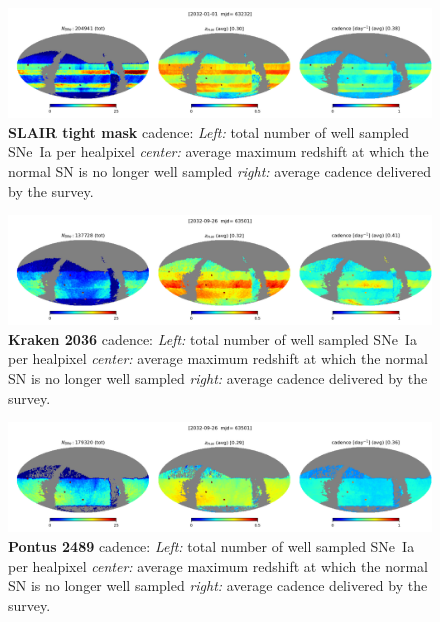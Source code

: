 \begin{figure}[h!]
  \begin{center}
    \includegraphics[width=\linewidth]{Figures/tight_mask_10yrs_64_maps.png}
    \caption{{\bf SLAIR tight mask} cadence: {\em Left:} total number of well
      sampled SNe~Ia per healpixel {\em center:} average maximum
      redshift at which the normal SN is no longer well sampled {\em
        right:} average cadence delivered by the survey.}
    \label{fig:tight_mask}
  \end{center}
\end{figure}

\begin{figure}[h!]
  \begin{center}
    \includegraphics[width=\linewidth]{Figures/kraken_2036_64_maps.png}
    \caption{{\bf Kraken 2036} cadence: {\em Left:} total number of well
      sampled SNe~Ia per healpixel {\em center:} average maximum
      redshift at which the normal SN is no longer well sampled {\em
        right:} average cadence delivered by the survey.}
    \label{fig:kraken_2036}
  \end{center}
\end{figure}

\begin{figure}[h!]
  \begin{center}
    \includegraphics[width=\linewidth]{Figures/pontus_2489_64_maps.png}
    \caption{{\bf Pontus 2489} cadence: {\em Left:} total number of well
      sampled SNe~Ia per healpixel {\em center:} average maximum
      redshift at which the normal SN is no longer well sampled {\em
        right:} average cadence delivered by the survey.}
    \label{fig:pontus_2489}
  \end{center}
\end{figure}

